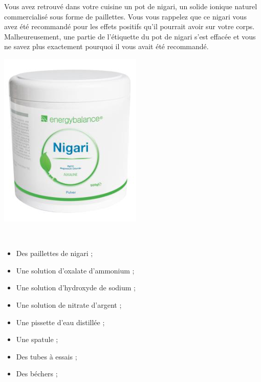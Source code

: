 \begin{tcolorbox}[colback=orange!5!white,colframe=orange!75!black,title= Contexte : à quoi sert le nigari ? :]

\begin{minipage}{0.75\textwidth}
    Vous avez retrouvé dans votre cuisine un pot de nigari, un solide ionique naturel commercialisé sous forme de paillettes. Vous vous rappelez que ce nigari vous avez été recommandé pour les effets positifs qu'il pourrait avoir sur votre corps. Malheureusement, une partie de l’étiquette du pot de nigari s’est effacée et vous ne savez plus exactement pourquoi il vous avait été recommandé. 
\end{minipage}
\begin{minipage}{0.2\textwidth}
\begin{center}
    \includegraphics[scale=0.7]{Images/Nigari.PNG}
\end{center}
    
\end{minipage}
\\
\end{tcolorbox}


\begin{mdframed}[style=autreexo]
\textbf{}
\vspace{-0.5cm}
\begin{multicols}{2}
\begin{itemize}
    \item Des paillettes de nigari ;
    \item Une solution d'oxalate d'ammonium ;
    \item Une solution d'hydroxyde de sodium ;
    \item Une solution de nitrate d'argent ;
    \item Une pissette d'eau distillée ; 
    \item Une spatule ;
    \item Des tubes à essais ;
    \item Des béchers ;
\end{itemize}
\end{multicols}
\end{mdframed}

